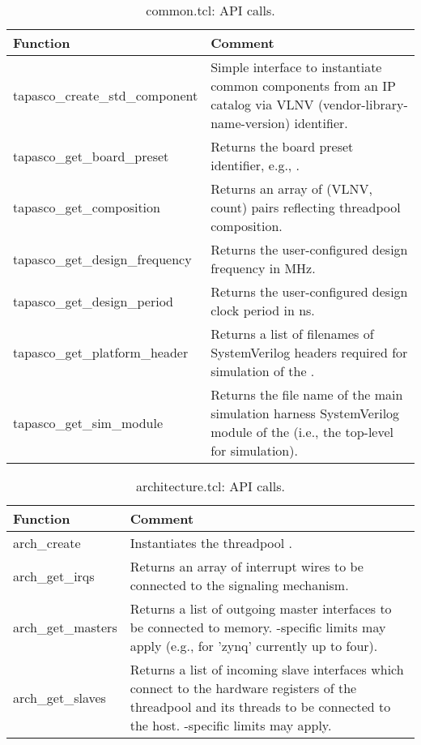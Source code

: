%
\begin{longtable}[c]{>{\ttfamily}L{0.45\textwidth}L{0.45\textwidth}}
  \caption{common.tcl: API calls.}
  \label{tbl:common.tcl}\\
  \toprule
  \normalfont\textbf{Function} & \textbf{Comment}\\\midrule
  \endhead
  \bottomrule
  \endlastfoot
  tapasco\_create\_std\_component & Simple interface to instantiate common components from an IP catalog via VLNV (vendor-library-name-version) identifier.\\\midrule
  tapasco\_get\_board\_preset & Returns the board preset identifier, e.g., .\\\midrule
  tapasco\_get\_composition & Returns an array of (VLNV, count) pairs reflecting threadpool composition.\\\midrule
  tapasco\_get\_design\_frequency & Returns the user-configured design frequency in MHz.\\\midrule
  tapasco\_get\_design\_period & Returns the user-configured design clock period in ns.\\\midrule
  tapasco\_get\_platform\_header & Returns a list of filenames of SystemVerilog headers required for simulation of the .\\\midrule
  tapasco\_get\_sim\_module & Returns the file name of the main simulation harness SystemVerilog module of the  (i.e., the top-level for simulation).\\
\end{longtable}
%
\begin{longtable}[c]{>{\ttfamily}L{0.45\textwidth}L{0.45\textwidth}}
  \caption{architecture.tcl: API calls.}
  \label{tbl:architecture.tcl}\\
  \toprule
  \normalfont\textbf{Function} & \textbf{Comment}\\\midrule
  \endhead
  \bottomrule
  \endlastfoot
  arch\_create & Instantiates the threadpool .\\\midrule
  arch\_get\_irqs & Returns an array of interrupt wires to be connected to the signaling mechanism.\\\midrule
  arch\_get\_masters & Returns a list of outgoing master interfaces to be connected to memory. -specific limits may apply (e.g., for 'zynq' currently up to four).\\\midrule
  arch\_get\_slaves & Returns a list of incoming slave interfaces which connect to the hardware registers of the threadpool and its threads to be connected to the host. -specific limits may apply.\\
\end{longtable}
